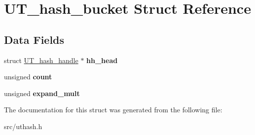 \hypertarget{structUT__hash__bucket}{\section{U\+T\+\_\+hash\+\_\+bucket Struct Reference}
\label{structUT__hash__bucket}
}
\subsection*{Data Fields}
\begin{DoxyCompactItemize}
\item 
\hypertarget{structUT__hash__bucket_a785a785132212378bb28fb4341cfecaf}{struct \hyperlink{structUT__hash__handle}{U\+T\+\_\+hash\+\_\+handle} $\ast$ {\bfseries hh\+\_\+head}}\label{structUT__hash__bucket_a785a785132212378bb28fb4341cfecaf}

\item 
\hypertarget{structUT__hash__bucket_a5d20cc12bdcbde360398910eefb45634}{unsigned {\bfseries count}}\label{structUT__hash__bucket_a5d20cc12bdcbde360398910eefb45634}

\item 
\hypertarget{structUT__hash__bucket_a9b739c1b69c141e8198c0c64af643b2b}{unsigned {\bfseries expand\+\_\+mult}}\label{structUT__hash__bucket_a9b739c1b69c141e8198c0c64af643b2b}

\end{DoxyCompactItemize}


The documentation for this struct was generated from the following file\+:\begin{DoxyCompactItemize}
\item 
src/uthash.\+h\end{DoxyCompactItemize}
